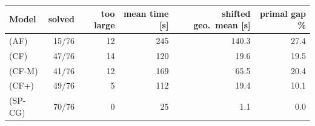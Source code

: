 \begin{tabular}{lrrrrr}
\toprule
Model & solved & too large & mean time [s] & shifted geo.\ mean [s] & primal gap \% \\
\midrule
(AF) & 15/76 & 12 & 245 & 140.3 & 27.4 \\
(CF) & 47/76 & 14 & 120 & 19.6 & 19.5 \\
(CF-M) & 41/76 & 12 & 169 & 65.5 & 20.4 \\
(CF+) & 49/76 & 5 & 112 & 19.4 & 10.1 \\
(SP-CG) & 70/76 & 0 & 25 & 1.1 & 0.0 \\
\bottomrule
\end{tabular}
